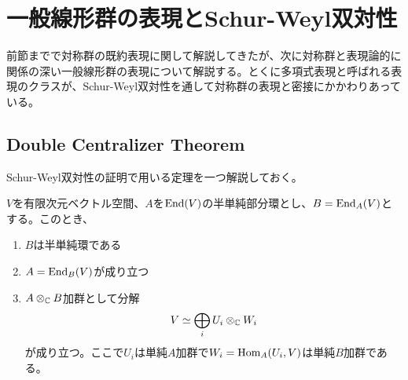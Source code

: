\documentclass{ltjsreport}
\begin{document}
\section{一般線形群の表現とSchur-Weyl双対性}

前節までで対称群の既約表現に関して解説してきたが、次に対称群と表現論的に関係の深い一般線形群の表現について解説する。とくに多項式表現と呼ばれる表現のクラスが、Schur-Weyl双対性を通して対称群の表現と密接にかかわりあっている。


\subsection{Double Centralizer Theorem}

Schur-Weyl双対性の証明で用いる定理を一つ解説しておく。

\begin{theo}\label{DCT}
  $V$を有限次元ベクトル空間、$A$を$\text{End}(V)$の半単純部分環とし、$B=\text{End}_A(V)$とする。このとき、
  \begin{enumerate}
    \item $B$は半単純環である
    \item $A=\text{End}_B(V)$が成り立つ
    \item $A\otimes_{\mathbb{C}} B$加群として分解
    \[
      V\simeq \bigoplus_iU_i\otimes_{\mathbb{C}} W_i  
    \]
    が成り立つ。ここで$U_i$は単純$A$加群で$W_i=\text{Hom}_A(U_i,V)$は単純$B$加群である。
  \end{enumerate}
\end{theo}
\end{document}
